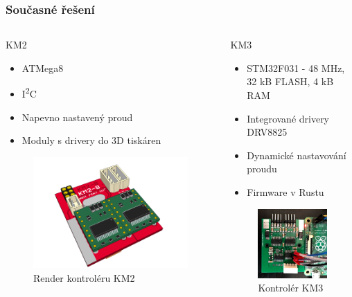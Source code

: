 \documentclass[%
  12pt,       				%
	t,                  %
	aspectratio=1610,   %
	unicode,						%
]{beamer}				    	%
\begin{document}
\begin{frame}
	\frametitle{Současné řešení}
	\begin{columns}[T] 								%
		\begin{column}{0.5\textwidth}
			KM2
			\begin{itemize}
				\item ATMega8
				\item I\textsuperscript{2}C
				\item Napevno nastavený proud
				\item Moduly s drivery do 3D tiskáren
			\end{itemize}
			\begin{figure}%
				\centering
				\vspace{0.2cm}	              %
				\includegraphics[width=0.5\columnwidth]{../Thesis/obrazky/km2render}
				\caption{Render kontroléru KM2}
				\label{fig:km2}
			\end{figure}
		\end{column}
		\begin{column}{0.5\textwidth}
			KM3
				\begin{itemize}
					\item STM32F031 - 48 MHz, 32 kB FLASH, 4 kB RAM
					\item Integrované drivery DRV8825
					\item Dynamické nastavování proudu
					\item Firmware v Rustu
				\end{itemize}
				\begin{figure}%
					\centering
					\vspace{0.1cm}	              %
					\includegraphics[width=0.4\columnwidth]{../Thesis/obrazky/km3}
					\caption{Kontrolér KM3}
					\label{fig:km3}
				\end{figure}
		\end{column}
	\end{columns}											%
\end{frame}
\end{document}
